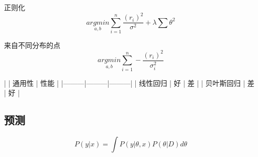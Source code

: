 正则化
\begin{equation}
 \underset{a,b} {argmin }{\sum_{i=1}^n }\frac{(r_i)^2}{\sigma^2}+\lambda\sum\theta^2
\end{equation}

来自不同分布的点
\begin{equation}
 \underset{a,b} {argmin }{\sum_{i=1}^n }-\frac{(r_i)^2}{\sigma_i^2}
\end{equation}

|          | 通用性 | 性能 |
|---------|---------|---------|
| 线性回归   | 好      | 差 |
| 贝叶斯回归 | 差      | 好 |

\subsection{预测}

\begin{equation}
 P(y|x)=\int P(y|\theta,x)P(\theta|D)d\theta
\end{equation}

